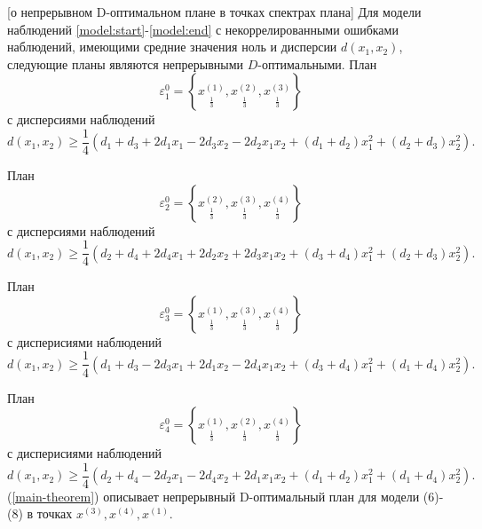 \begin{theorem}\label{main-theorem}[о непрерывном D-оптимальном плане в точках спектрах плана]
	Для модели наблюдений \eqref{model:start}-\eqref{model:end} с некоррелированными ошибками наблюдений, имеющими средние значения ноль и дисперсии $d(x_1, x_2)$, следующие планы являются непрерывными $D$-оптимальными. План
	\begin{equation} \label{main-theorem:plan-1}
	\varepsilon_1^{0} = \left \{ 
	\underset{\frac 1 3} {x^{(1)}},
	\underset{\frac 1 3} {x^{(2)}},
	\underset{\frac 1 3} {x^{(3)}}
	\right \}
	\end{equation}
	с дисперсиями наблюдений
	\begin{equation}
	d(x_1, x_2) \ge \frac 1 4 (d_1 + d_3 + 2 d_1 x_1 - 2 d_3 x_2 - 2d_2 x_1 x_2 + (d_1 + d_2)x_1^2 + (d_2 + d_3)x_2^2).
	\end{equation}
	
	План
	\begin{equation}
	\varepsilon_2^{0} = \left \{ 
	\underset{\frac 1 3} {x^{(2)}},
	\underset{\frac 1 3} {x^{(3)}},
	\underset{\frac 1 3} {x^{(4)}}
	\right \}
	\end{equation}
	с дисперсиями наблюдений
	\begin{equation}
	d(x_1, x_2) \ge \frac 1 4 (d_2 + d_4 + 2 d_4 x_1 + 2 d_2 x_2 + 2 d_3 x_1 x_2 + (d_3 + d_4)x_1^2 + (d_2 + d_3)x_2^2).
	\end{equation}
	
	План
	\begin{equation}
	\varepsilon_3^{0} = \left \{ 
	\underset{\frac 1 3} {x^{(1)}},
	\underset{\frac 1 3} {x^{(3)}},
	\underset{\frac 1 3} {x^{(4)}}
	\right \}
	\end{equation}
	с дисперисиями наблюдений
	\begin{equation}
	d(x_1, x_2) \ge \frac 1 4 (d_1 + d_3 - 2 d_3 x_1 + 2 d_1 x_2 - 2 d_4 x_1 x_2 + (d_3 + d_4)x_1^2 + (d_1 + d_4)x_2^2).
	\end{equation}
	
	План
	\begin{equation}
	\varepsilon_4^{0} = \left \{ 
	\underset{\frac 1 3} {x^{(1)}},
	\underset{\frac 1 3} {x^{(2)}},
	\underset{\frac 1 3} {x^{(4)}}
	\right \}
	\end{equation}
	с дисперисиями наблюдений
	\begin{equation}
	d(x_1, x_2) \ge \frac 1 4 (d_2 + d_4 - 2 d_2 x_1 - 2 d_4 x_2 + 2 d_1 x_1 x_2 + (d_1 + d_2)x_1^2 + (d_1 + d_4)x_2^2).
	\end{equation}
	(\ref{main-theorem}) описывает непрерывный D-оптимальный план для модели (6)-(8) в точках $x^{(3)}, x^{(4)}, x^{(1)}$.\\
\end{theorem}
